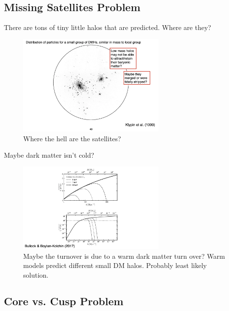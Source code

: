 \documentclass{article}
\begin{document}
\subsection{Missing Satellites Problem}

There are tons of tiny little halos that are predicted. Where are they?

\begin{figure}
    \centering
\includegraphics[width=0.66\textwidth]{figs/Screen Shot 2021-10-13 at 10.52.27 AM.png}
    \caption{Where the hell are the satellites?}
    \label{fig:missing_satellites}
\end{figure}

Maybe dark matter isn't cold?

\begin{figure}
    \centering
\includegraphics[width=0.66\textwidth]{figs/Screen Shot 2021-10-13 at 10.54.20 AM.png}
    \caption{Maybe the turnover is due to a warm dark matter turn over? Warm models predict different small DM halos. Probably least likely solution.}
    \label{fig:warmdm}
\end{figure}

\subsection{Core vs. Cusp Problem}
\end{document}
